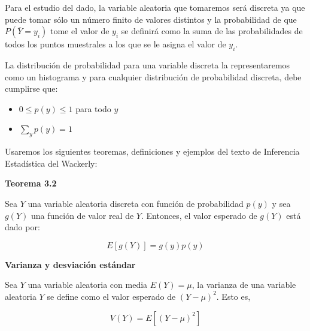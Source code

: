 \documentclass[
]{article}
\begin{document}
\newenvironment{cajainferencia}{
  \begin{center}
  \begin{minipage}{0.9\textwidth}
  \begin{mdframed}[backgroundcolor=lightgray,linewidth=0pt]
}{
  \end{mdframed}
  \end{minipage}
  \end{center}
}


Para el estudio del dado, la variable aleatoria que tomaremos será discreta ya que puede tomar sólo un número finito de valores distintos y la probabilidad de que $P(\bar{Y}=y_i)$ tome el valor de $y_i$ se definirá como la suma de las probabilidades de todos los puntos muestrales a los que se le asigna el valor de $y_i$. 

La distribución de probabilidad para una variable discreta la representaremos como un histograma y para cualquier distribución de probabilidad discreta, debe cumplirse que:

\begin{itemize}
  
  \item $0 \leq p(y) \leq 1$ para todo $y$
  
  \item $\displaystyle \sum_{y} p(y)=1$
\end{itemize}

Usaremos los siguientes teoremas, definiciones y ejemplos del texto de Inferencia Estadística del Wackerly:

\begin{cajainferencia}
\textbf{Teorema 3.2}

Sea $Y$ una variable aleatoria discreta con función de probabilidad $p(y)$ y sea $g(Y)$ una función de valor real de $Y$. Entonces, el valor esperado de $g(Y)$ está dado por: 

$$ E[g(Y)] = g(y)p(y)$$

\end{cajainferencia}



\begin{cajainferencia}
\textbf{Varianza y desviación estándar}

Sea $Y$ una variable aleatoria con media $E(Y)=\mu$, la varianza de una variable aleatoria $Y$ se define como el valor esperado de $(Y-\mu)^{2}$. Esto es,

$$ V(Y) = E[(Y-\mu)^{2}]$$

\end{cajainferencia}
\end{document}
